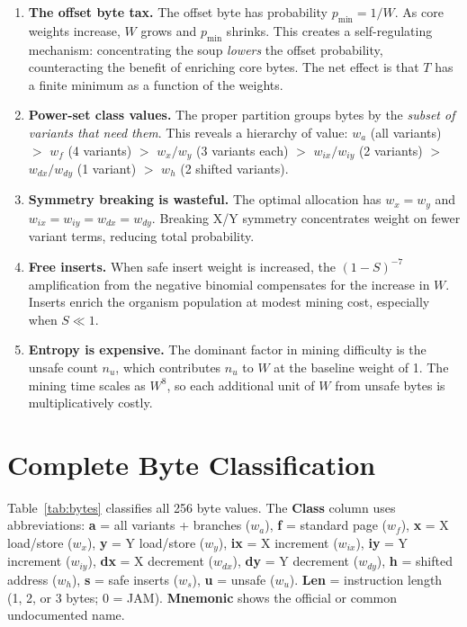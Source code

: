 \documentclass{article}
\newcommand{\wa}{w_a}
\newcommand{\wf}{w_f}
\newcommand{\wx}{w_x}
\newcommand{\wy}{w_y}
\newcommand{\wix}{w_{ix}}
\newcommand{\wiy}{w_{iy}}
\newcommand{\wdx}{w_{dx}}
\newcommand{\wdy}{w_{dy}}
\newcommand{\wh}{w_h}
\newcommand{\ws}{w_s}
\newcommand{\wu}{w_u}
\newcommand{\pmin}{p_{\min}}
\begin{document}
\begin{enumerate}
\item \textbf{The offset byte tax.}
  The offset byte has probability $\pmin = 1/W$.  As core weights
  increase, $W$ grows and $\pmin$ shrinks.  This creates a
  self-regulating mechanism: concentrating the soup \emph{lowers}
  the offset probability, counteracting the benefit of enriching
  core bytes.  The net effect is that $T$ has a finite minimum
  as a function of the weights.

\item \textbf{Power-set class values.}
  The proper partition groups bytes by the \emph{subset of variants
  that need them}.  This reveals a hierarchy of value:
  $\wa$ (all variants) $>$ $\wf$ (4 variants) $>$ $\wx/\wy$
  (3 variants each) $>$ $\wix/\wiy$ (2 variants) $>$
  $\wdx/\wdy$ (1 variant) $>$ $\wh$ (2 shifted variants).

\item \textbf{Symmetry breaking is wasteful.}
  The optimal allocation has $\wx = \wy$ and
  $\wix = \wiy = \wdx = \wdy$.
  Breaking X/Y symmetry concentrates weight on fewer variant terms,
  reducing total probability.

\item \textbf{Free inserts.}
  When safe insert weight is increased, the $(1-S)^{-7}$
  amplification from the negative binomial compensates for the
  increase in $W$.  Inserts enrich the organism population at
  modest mining cost, especially when $S \ll 1$.

\item \textbf{Entropy is expensive.}
  The dominant factor in mining difficulty is the unsafe count
  $n_u$, which contributes $n_u$ to $W$ at the baseline weight
  of 1.  The mining time scales as $W^8$, so each additional
  unit of $W$ from unsafe bytes is multiplicatively costly.
\end{enumerate}

\appendix
\section{Complete Byte Classification}
\label{app:bytes}

Table~\ref{tab:bytes} classifies all 256 byte values.  The
\textbf{Class} column uses abbreviations:
\textbf{a} = all variants + branches ($\wa$),
\textbf{f} = standard page ($\wf$),
\textbf{x} = X load/store ($\wx$),
\textbf{y} = Y load/store ($\wy$),
\textbf{ix} = X increment ($\wix$),
\textbf{iy} = Y increment ($\wiy$),
\textbf{dx} = X decrement ($\wdx$),
\textbf{dy} = Y decrement ($\wdy$),
\textbf{h} = shifted address ($\wh$),
\textbf{s} = safe inserts ($\ws$),
\textbf{u} = unsafe ($\wu$).
\textbf{Len} = instruction length (1, 2, or 3 bytes; 0 = JAM).
\textbf{Mnemonic} shows the official or common undocumented name.
\end{document}

